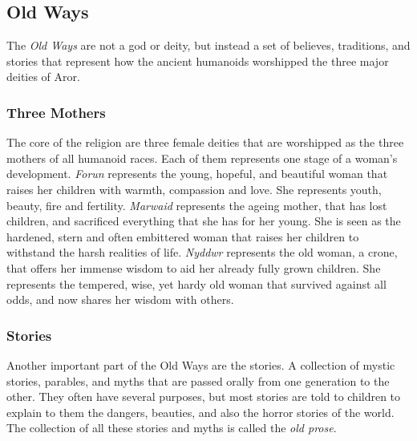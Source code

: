 \subsection{Old Ways}

The \emph{Old Ways} are not a god or deity, but instead a set of believes,
traditions, and stories that represent how the ancient humanoids worshipped
the three major deities of Aror.

\subsubsection*{Three Mothers}

The core of the religion are three female deities that are worshipped as the
three mothers of all humanoid races. Each of them represents one stage of
a woman's development. \emph{Forun} represents the young, hopeful, and
beautiful woman that raises her children with warmth, compassion and love. She
represents youth, beauty, fire and fertility. \emph{Marwaid} represents the
ageing mother, that has lost children, and sacrificed everything that she has
for her young. She is seen as the hardened, stern and often embittered woman
that raises her children to withstand the harsh realities of life.
\emph{Nyddwr} represents the old woman, a crone, that offers her immense
wisdom to aid her already fully grown children. She represents the tempered,
wise, yet hardy old woman that survived against all odds, and now shares her
wisdom with others.

\subsubsection*{Stories}



Another important part of the Old Ways are the stories. A collection of mystic
stories, parables, and myths that are passed orally from one generation to the
other. They often have several purposes, but most stories are told to children
to explain to them the dangers, beauties, and also the horror stories of the
world. The collection of all these stories and myths is called the
\emph{old prose}.

